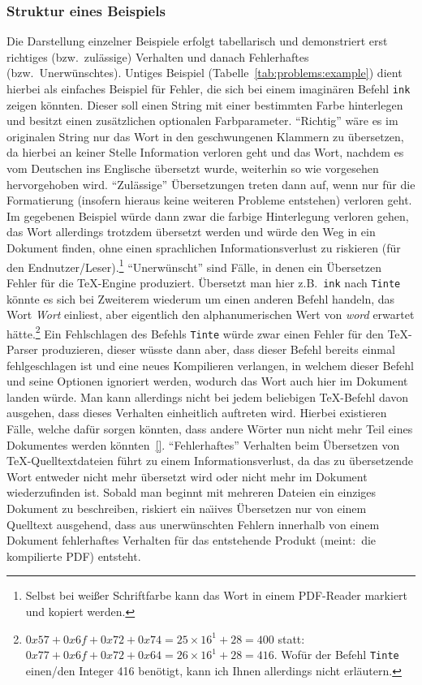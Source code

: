 \subsubsection*{Struktur eines Beispiels}
Die Darstellung einzelner Beispiele erfolgt tabellarisch und demonstriert erst richtiges (bzw.\ zulässige) Verhalten und danach Fehlerhaftes (bzw.\ Unerwünschtes). Untiges Beispiel (Tabelle~\ref{tab:problems:example}) dient hierbei als einfaches Beispiel für Fehler, die sich bei einem imaginären Befehl \texttt{ink} zeigen könnten. Dieser soll einen String mit einer bestimmten Farbe hinterlegen und besitzt einen zusätzlichen optionalen Farbparameter. 
\enquote{Richtig} wäre es im originalen String nur das Wort in den geschwungenen Klammern zu übersetzen, da hierbei an keiner Stelle Information verloren geht und das Wort, nachdem es vom Deutschen ins Englische übersetzt wurde, weiterhin so wie vorgesehen hervorgehoben wird.
\enquote{Zulässige} Übersetzungen treten dann auf, wenn nur für die Formatierung (insofern hieraus keine weiteren Probleme entstehen) verloren geht. Im gegebenen Beispiel würde dann zwar die farbige Hinterlegung verloren gehen, das Wort allerdings trotzdem übersetzt werden und würde den Weg in ein Dokument finden, ohne einen sprachlichen Informationsverlust zu riskieren (für den Endnutzer/Leser).\footnote{Selbst bei weißer Schriftfarbe kann das Wort in einem PDF-Reader markiert und kopiert werden.}
\enquote{Unerwünscht} sind Fälle, in denen ein Übersetzen Fehler für die \TeX{}-Engine produziert. Übersetzt man hier z.B.\ \texttt{ink} nach \texttt{Tinte} könnte es sich bei Zweiterem wiederum um einen anderen Befehl handeln, das Wort \textit{Wort} einliest, aber eigentlich den alphanumerischen Wert von \textit{word} erwartet hätte.\footnote{$0x57+0x6f + 0x72 + 0x74 = 25\times 16^1 + 28 = 400$ statt:\ $0x77+0x6f + 0x72 + 0x64 = 26\times 16^1 + 28 = 416$. Wofür der Befehl \texttt{Tinte} einen/den Integer 416 benötigt, kann ich Ihnen allerdings nicht erläutern.} Ein Fehlschlagen des Befehls \texttt{Tinte} würde zwar einen Fehler für den \TeX{}-Parser produzieren, dieser wüsste dann aber, dass dieser Befehl bereits einmal fehlgeschlagen ist und eine neues Kompilieren verlangen, in welchem dieser Befehl und seine Optionen ignoriert werden, wodurch das Wort auch hier im Dokument landen würde. Man kann allerdings nicht bei jedem beliebigen \TeX{}-Befehl davon ausgehen, dass dieses Verhalten einheitlich auftreten wird. Hierbei existieren Fälle, welche dafür sorgen könnten, dass andere Wörter nun nicht mehr Teil eines Dokumentes werden könnten~\ref{}.%
\enquote{Fehlerhaftes} Verhalten beim Übersetzen von \TeX{}-Quelltextdateien führt zu einem Informationsverlust, da das zu übersetzende Wort entweder nicht mehr übersetzt wird oder nicht mehr im Dokument wiederzufinden ist. Sobald man beginnt mit mehreren Dateien ein einziges Dokument zu beschreiben, riskiert ein na\"\i ives Übersetzen nur von einem Quelltext ausgehend, dass aus unerwünschten Fehlern innerhalb von einem Dokument fehlerhaftes Verhalten für das entstehende Produkt (meint:\ die kompilierte PDF) entsteht. 

